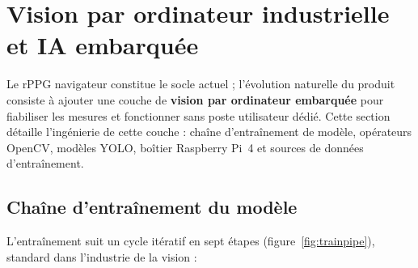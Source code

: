 \documentclass[11pt,a4paper]{article}
\begin{document}
\section{Vision par ordinateur industrielle et IA embarquée}
\label{sec:vision}

Le rPPG navigateur constitue le socle actuel ; l'évolution naturelle du produit consiste à ajouter une
couche de \textbf{vision par ordinateur embarquée} pour fiabiliser les mesures et fonctionner sans
poste utilisateur dédié. Cette section détaille l'ingénierie de cette couche : chaîne d'entraînement de
modèle, opérateurs OpenCV, modèles YOLO, boîtier Raspberry Pi~4 et sources de données d'entraînement.

\subsection{Chaîne d'entraînement du modèle}
\label{sec:training}
L'entraînement suit un cycle itératif en sept étapes (figure~\ref{fig:trainpipe}), standard dans
l'industrie de la vision \cite{redmon2016,ultralytics2024} :
\end{document}
